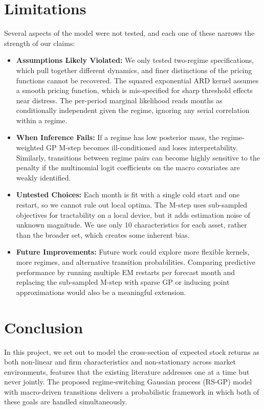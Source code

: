 \documentclass[11pt]{article}
\begin{document}
\section{Limitations}
Several aspects of the model were not tested, and each one of these narrows the strength of our claims:
\begin{itemize}
	\item \textbf{Assumptions Likely Violated:} We only tested two-regime specifications, which pull together different dynamics, and finer distinctions of the pricing functions cannot be recovered. The squared exponential ARD kernel assumes a smooth pricing function, which is mis-specified for sharp threshold effects near distress. The per-period marginal likelihood reads months as conditionally independent given the regime, ignoring any serial correlation within a regime. 
	\item \textbf{When Inference Fails:} If a regime has low posterior mass, the regime-weighted GP M-step becomes ill-conditioned and loses interpretability. Similarly, transitions between regime pairs can become highly sensitive to the penalty if the multinomial logit coefficients on the macro covariates are weakly identified. 
	\item \textbf{Untested Choices:} Each month is fit with a single cold start and one restart, so we cannot rule out local optima. The M-step uses sub-sampled objectives for tractability on a local device, but it adds estimation noise of unknown magnitude. We use only 10 characteristics for each asset, rather than the broader set, which creates some inherent bias. 
	\item \textbf{Future Improvements:} Future work could explore more flexible kernels, more regimes, and alternative transition probabilities. Comparing predictive performance by running multiple EM restarts per forecast month and replacing the sub-sampled M-step with sparse GP or inducing point approximations would also be a meaningful extension. 
\end{itemize}

\section{Conclusion}
In this project, we set out to model the cross-section of expected stock returns as both non-linear and firm characteristics and non-stationary across market environments, features that the existing literature addresses one at a time but never jointly. The proposed regime-switching Gaussian process (RS-GP) model with macro-driven transitions delivers a probabilistic framework in which both of these goals are handled simultaneously. 
\end{document}
